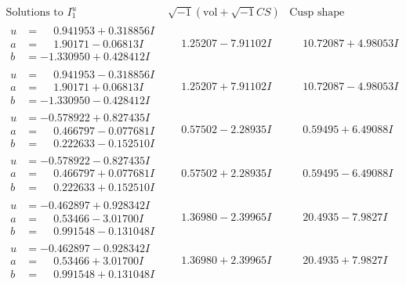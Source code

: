 \documentclass[1p]{elsarticle_modified}
\theoremstyle{definition}
\newcommand{\I}{\sqrt{-1}}
\begin{document}
$$\begin{array}{c|c|c}  
\text{Solutions to }I^u_{1}& \I (\text{vol} + \sqrt{-1}CS) & \text{Cusp shape}\\
 \hline 
\begin{aligned}
u &= \phantom{-}0.941953 + 0.318856 I \\
a &= \phantom{-}1.90171 - 0.06813 I \\
b &= -1.330950 + 0.428412 I\end{aligned}
 & \phantom{-}1.25207 - 7.91102 I & \phantom{-}10.72087 + 4.98053 I \\ \hline\begin{aligned}
u &= \phantom{-}0.941953 - 0.318856 I \\
a &= \phantom{-}1.90171 + 0.06813 I \\
b &= -1.330950 - 0.428412 I\end{aligned}
 & \phantom{-}1.25207 + 7.91102 I & \phantom{-}10.72087 - 4.98053 I \\ \hline\begin{aligned}
u &= -0.578922 + 0.827435 I \\
a &= \phantom{-}0.466797 - 0.077681 I \\
b &= \phantom{-}0.222633 - 0.152510 I\end{aligned}
 & \phantom{-}0.57502 - 2.28935 I & \phantom{-}0.59495 + 6.49088 I \\ \hline\begin{aligned}
u &= -0.578922 - 0.827435 I \\
a &= \phantom{-}0.466797 + 0.077681 I \\
b &= \phantom{-}0.222633 + 0.152510 I\end{aligned}
 & \phantom{-}0.57502 + 2.28935 I & \phantom{-}0.59495 - 6.49088 I \\ \hline\begin{aligned}
u &= -0.462897 + 0.928342 I \\
a &= \phantom{-}0.53466 - 3.01700 I \\
b &= \phantom{-}0.991548 - 0.131048 I\end{aligned}
 & \phantom{-}1.36980 - 2.39965 I & \phantom{-}20.4935 - 7.9827 I \\ \hline\begin{aligned}
u &= -0.462897 - 0.928342 I \\
a &= \phantom{-}0.53466 + 3.01700 I \\
b &= \phantom{-}0.991548 + 0.131048 I\end{aligned}
 & \phantom{-}1.36980 + 2.39965 I & \phantom{-}20.4935 + 7.9827 I \\ \hline\begin{aligned}

\end{aligned}
\end{array}$$
\end{document}
